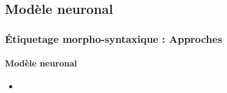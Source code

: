 \documentclass[xcolor=table]{beamer}
\begin{document}
\subsection{Modèle neuronal}

\begin{frame}
\frametitle{Étiquetage morpho-syntaxique : Approches}
\framesubtitle{Modèle neuronal}

\begin{itemize}
	\item 
\end{itemize}

\end{frame}

\end{document}
